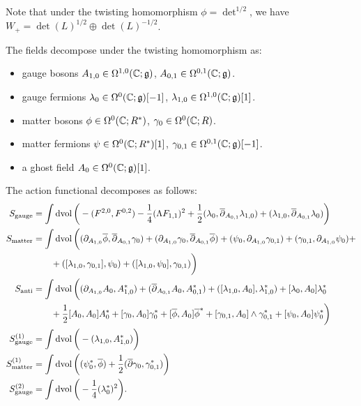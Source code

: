 \documentclass[10pt, oneside]{article}
\begin{document}
Note that under the twisting homomorphism $\phi = \det^{1/2}$, we have $W_+ = \det(L)^{1/2} \oplus \det(L)^{-1/2}$.

The fields decompose under the twisting homomorphism as:
\begin{itemize}
\item gauge bosons $A_{1,0} \in \Omega^{1,0}(\mathbb C ; \mathfrak g)$, $A_{0,1} \in \Omega^{0,1}(\mathbb C ; \mathfrak g)$.
\item gauge fermions $\lambda_0 \in \Omega^0(\mathbb C ; \mathfrak g)[-1]$, $\lambda_{1,0} \in \Omega^{1,0}(\mathbb C ; \mathfrak g) [1]$.
\item matter bosons $\phi \in \Omega^0(\mathbb C ; R^*)$, $\gamma_0 \in \Omega^0(\mathbb C ; R)$.
\item matter fermions $\psi \in \Omega^{0}(\mathbb C ; R^*)[1]$, $\gamma_{0,1} \in \Omega^{0,1}(\mathbb C ; \mathfrak g)[-1]$.
\item a ghost field $A_0 \in \Omega^0(\mathbb C ; \mathfrak g)[1]$.
\end{itemize}

The action functional decomposes as follows:
\begin{align*}
S_{\mathrm{gauge}} &= \int \operatorname{dvol} \bigg(-(F^{2, 0}, F^{0, 2}) - \frac{1}{4}(\Lambda F_{1, 1})^2 + \frac 12 (\lambda_0 , \overline{\partial}_{A_{0,1}} \lambda_{1,0}) +(\lambda_{1,0} , \overline{\partial}_{A_{0,1}} \lambda_{0}) \bigg)    \\
S_{\mathrm{matter}} &= \int \operatorname{dvol} \bigg( (\partial_{A_{1,0}}\overline{\phi} , \overline{\partial}_{A_{0,1}} \gamma_0) + (\partial_{A_{1,0}}\gamma_0, \overline{\partial}_{A_{0,1}} \overline{\phi}) + (\psi_0 , \partial_{A_{1,0}} \gamma_{0,1}) + (\gamma_{0,1} , \partial_{A_{1,0}} \psi_{0})  + \\
&\qquad + ([\lambda_{1,0},\gamma_{0,1}],\psi_0) + ([\lambda_{1,0}, \psi_0], \gamma_{0,1})   \bigg) \\
S_{\mathrm{anti}} &= \int \operatorname{dvol} \bigg( (\partial_{A_{1, 0}} A_0 , A_{1,0}^*) + (\overline{\partial}_{A_{0, 1}} A_0, A_{0,1}^*) + ([\lambda_{1,0}, A_0], \lambda_{1,0}^*) +  [\lambda_{0}, A_0] \lambda_{0}^*\\
&\qquad + \frac{1}{2}[A_0, A_0]A_0^* + [\gamma_0, A_0] \gamma_0^* + [\overline{\phi}, A_0] \overline{\phi}^* + [\gamma_{0,1}, A_0]\wedge \gamma_{0,1}^* + [\psi_0, A_0] \psi_{0}^*\bigg) \\
S^{(1)}_{\mathrm{gauge}} &=  \int \operatorname{dvol} \bigg( - (\lambda_{1,0}, A_{1,0}^*) \bigg) \\
S^{(1)}_{\mathrm{matter}} &=  \int \operatorname{dvol} \bigg( (\psi_{0}^*, \overline{\phi}) + \frac 12(\overline{\partial} \gamma_0, \gamma_{0,1}^*) \bigg)\\
S^{(2)}_{\mathrm{gauge}} &= \int \operatorname{dvol} \bigg( -\frac{1}{4} (\lambda_0^*)^2 \bigg) .
\end{align*}
\end{document}
